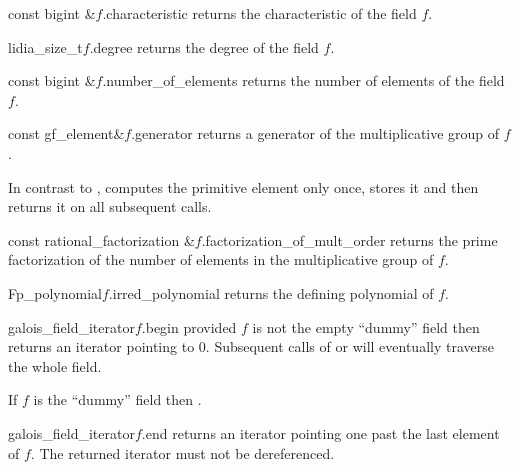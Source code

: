 \begin{cfcode}{const bigint &}{$f$.characteristic}{}
  returns the characteristic of the field $f$.
\end{cfcode}

\begin{cfcode}{lidia_size_t}{$f$.degree}{}
  returns the degree of the field $f$.
\end{cfcode}

\begin{cfcode}{const bigint &}{$f$.number_of_elements}{}
  returns the number of elements of the field $f$.
\end{cfcode}

\begin{cfcode}{const gf_element&}{$f$.generator}{}
  returns a generator of the multiplicative group of $f$.

  In contrast to ,  computes the primitive element only once,
  stores it and then returns it on all subsequent calls. 
\end{cfcode}

\begin{cfcode}{const rational_factorization &}{$f$.factorization_of_mult_order}{}
  returns the prime factorization of the number of elements in the multiplicative group of $f$.
\end{cfcode}

\begin{cfcode}{Fp_polynomial}{$f$.irred_polynomial}{}
  returns the defining polynomial of $f$.
\end{cfcode}

\begin{cfcode}{galois_field_iterator}{$f$.begin}{}
  provided $f$ is not the empty ``dummy'' field then 
  returns an iterator  pointing to $0$. Subsequent calls of
   or  will eventually traverse the whole field.

  If $f$ is the ``dummy'' field then .
\end{cfcode}

\begin{cfcode}{galois_field_iterator}{$f$.end}{}
  returns an iterator pointing one past the last element of $f$. The returned
  iterator must not be dereferenced.
\end{cfcode}


